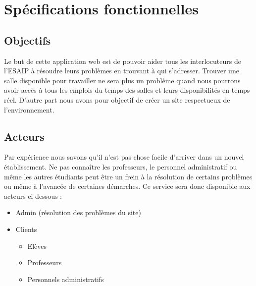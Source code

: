 \documentclass[11pt,a4paper]{report}
\begin{document}
	\chapter{Spécifications fonctionnelles}
		\section{Objectifs}
		Le but de cette application web est de pouvoir aider tous les interlocuteurs de l'ESAIP à résoudre leurs problèmes en trouvant à qui s'adresser. Trouver une salle disponible pour travailler ne sera plus un problème quand nous pourrons avoir accès à tous les emplois du temps des salles et leurs disponibilités en temps réel. D'autre part nous avons pour objectif de créer un site respectueux de l'environnement. 
		\section{Acteurs} 
		Par expérience nous savons qu'il n'est pas chose facile d'arriver dans un nouvel établissement. Ne pas connaître les professeurs, le personnel administratif ou même les autres étudiants peut être un frein à la résolution de certains problèmes ou même à l'avancée de certaines démarches. Ce service sera donc disponible aux acteurs ci-dessous :
			\begin{itemize}
				\item Admin (résolution des problèmes du site)
				\item Clients
					\begin{itemize}
						\item Elèves
						\item Professeurs
						\item Personnels administratifs
					\end{itemize}
			\end{itemize}
\end{document}
